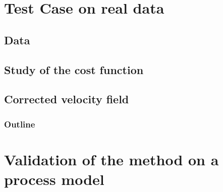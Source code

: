 \documentclass[compress,slidescentered,notes=show]{beamer}
\begin{document}
\section[Real data]{Test Case on real data}

	\subsection{Data}
\begin{frame}
\end{frame}

	\subsection[Cost function]{Study of the cost function}
\begin{frame}
\end{frame}

	\subsection[Corrections]{Corrected velocity field}
\begin{frame}
\end{frame}

\begin{frame}
\end{frame}

\begin{frame}
  \frametitle{Outline}
  \tableofcontents%
\end{frame}


\section[Process model data]{Validation of the method on a process model}
\end{document}
